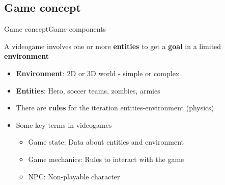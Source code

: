 \documentclass[10pt,compress]{beamer} %
\begin{document}
\subsection[Game concept]{Game concept}
\begin{frame}{Game concept}{Game components}
	\begin{block}{}
	A videogame involves one or more \textbf{entities} to get a \textbf{goal} in a limited \textbf{environment}
	\end{block}

	\begin{itemize}
	\item \textbf{Environment}: 2D or 3D world - simple or complex
	\item \textbf{Entities}: Hero, soccer teams, zombies, armies
	\item There are \textbf{rules} for the iteration entities-environment (\alert{physics})
	\item Some key terms in videogames
	\begin{itemize}
		\item \alert{Game state}: Data about entities and environment
		\item \alert{Game mechanics}: Rules to interact with the game
		\item NPC: Non-playable character
	\end{itemize}
	\end{itemize}

\end{frame}
\end{document}
